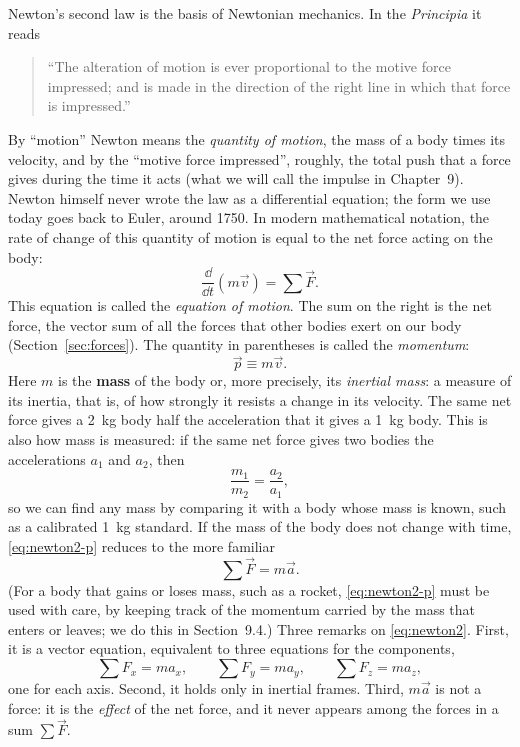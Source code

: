 \documentclass[11pt,a4paper]{article}
\begin{document}
Newton's second law is the basis of Newtonian mechanics. In the \emph{Principia} it reads
\begin{quote}
``The alteration of motion is ever proportional to the motive force impressed; and is made in the
direction of the right line in which that force is impressed.''
\end{quote}
By ``motion'' Newton means the \emph{quantity of motion}, the mass of a body times its velocity, and
by the ``motive force impressed'', roughly, the total push that a force gives during the time it
acts (what we will call the impulse in Chapter~9). Newton himself never wrote the law as a
differential equation; the form we use today goes back to Euler, around 1750. In modern
mathematical notation, the rate of change of this quantity of motion is equal to the net force
acting on the body:
\begin{equation}\label{eq:newton2-p}
  \frac{\dd}{\dd t}(m\vec{v}) = \sum \vec{F} .
\end{equation}
This equation is called the \emph{equation of motion}. The sum on the right is the net force, the
vector sum of all the forces that other bodies exert on our body (Section~\ref{sec:forces}). The
quantity in parentheses is called the \emph{momentum}:
\begin{equation}\label{eq:p}
  \vec{p} \equiv m\vec{v} .
\end{equation}
Here $m$ is the \textbf{mass} of the body or, more precisely, its \emph{inertial mass}: a measure of
its inertia, that is, of how strongly it resists a change in its velocity. The same net force gives
a \qty{2}{kg} body half the acceleration that it gives a \qty{1}{kg} body. This is also how mass is
measured: if the same net force gives two bodies the accelerations $a_1$ and $a_2$, then
\[
  \frac{m_1}{m_2} = \frac{a_2}{a_1} ,
\]
so we can find any mass by comparing it with a body whose mass is known, such as a calibrated
\qty{1}{kg} standard. If the mass of the body does not
change with time, \eqref{eq:newton2-p} reduces to the more familiar
\begin{equation}\label{eq:newton2}
  \sum \vec{F} = m\vec{a} .
\end{equation}
(For a body that gains or loses mass, such as a rocket, \eqref{eq:newton2-p} must be used with care,
by keeping track of the momentum carried by the mass that enters or leaves; we do this in
Section~9.4.) Three remarks on \eqref{eq:newton2}. First, it is a vector equation, equivalent to
three equations for the components,
\[
  \sum F_x = m a_x , \qquad \sum F_y = m a_y , \qquad \sum F_z = m a_z ,
\]
one for each axis. Second, it holds only in inertial frames. Third, $m\vec{a}$ is not a force: it
is the \emph{effect} of the net force, and it never appears among the forces in a sum
$\sum\vec{F}$.
\end{document}
